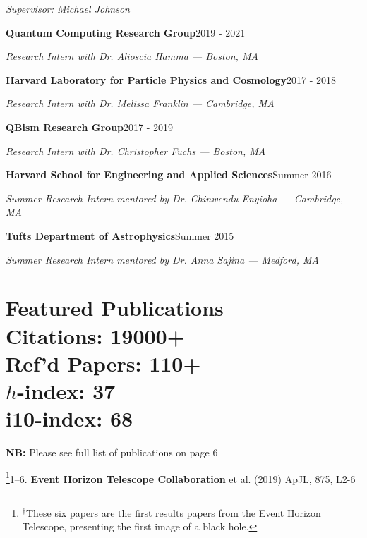 \documentclass[margin,line]{res}
\begin{document}
\begin{resume}
\begin{changemargin}{-0.0cm}{2.5cm}
\textit{Supervisor: Michael Johnson}
\end{changemargin}

{\bf Quantum Computing Research Group}\hfill 2019 - 2021

\vspace{-.4cm}
{\em Research Intern with Dr. Alioscia Hamma  --- Boston, MA}

\vspace{.1cm}
{\bf Harvard Laboratory for Particle Physics and Cosmology}\hfill 2017 - 2018

\vspace{-.4cm}
{\em Research Intern with Dr. Melissa Franklin --- Cambridge, MA}

% 
{\bf QBism Research Group}\hfill 2017 - 2019

\vspace{-.4cm}
{\em Research Intern with Dr. Christopher Fuchs  --- Boston, MA}

{\bf Harvard School for Engineering and Applied Sciences}\hfill Summer 2016

\vspace{-.4cm}
{\em Summer Research Intern mentored by Dr. Chinwendu Enyioha --- Cambridge, MA}

{\bf Tufts Department of Astrophysics}\hfill Summer 2015

\vspace{-.4cm}
{\em Summer Research Intern mentored by Dr. Anna Sajina --- Medford, MA}




\vspace{+.4cm}
\section{{\sc Featured Publications  \\ \vspace{0.3cm} {\footnotesize Citations: 19000+ \\ \vspace{0.1cm} \noindent Ref'd Papers: 110+ \vspace{0.1cm} \\ $h$-index: 37 \\ i10-index: 68}} \\ }

\textbf{NB:} Please see full list of publications on page 6


\footnote[$\dagger$]{\noindent $^\dagger$These six papers are the first results papers from the Event Horizon Telescope, presenting the first image of a black hole.}1--6. \textbf{Event Horizon Telescope Collaboration} et al. (2019) ApJL, 875, L2-6




\end{resume}
\end{document}
